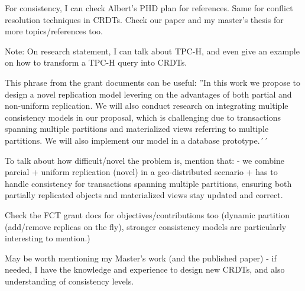 For consistency, I can check Albert's PHD plan for references. Same for conflict resolution techniques in CRDTs.
Check our paper and my master's thesis for more topics/references too.

Note: On research statement, I can talk about TPC-H, and even give an example on how to transform a TPC-H query into CRDTs.

This phrase from the grant documents can be useful:
''In this work we propose to design a novel replication model levering on the advantages of both partial and non-uniform replication. We will also conduct research on integrating multiple consistency models in our proposal, which is challenging due to transactions spanning multiple partitions and materialized views referring to multiple partitions. We will also implement our model in a database prototype.´´

To talk about how difficult/novel the problem is, mention that: - we combine parcial + uniform replication (novel) in a geo-distributed scenario + has to handle consistency for transactions spanning multiple partitions, ensuring both partially replicated objects and materialized views stay updated and correct.

Check the FCT grant docs for objectives/contributions too (dynamic partition (add/remove replicas on the fly), stronger consistency models are particularly interesting to mention.)

May be worth mentioning my Master's work (and the published paper) - if needed, I have the knowledge and experience to design new CRDTs, and also understanding of consistency levels.
